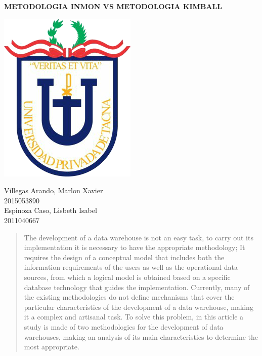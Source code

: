 \documentclass[preprint,12pt]{elsarticle}
\begin{document}
	
	\begin{center}
		\huge \textbf{METODOLOGIA INMON VS METODOLOGIA KIMBALL} 
	\end{center}
	\vspace{\baselineskip}
	\begin{center}
		\includegraphics[scale=0.37]{./IMAGENES/logo}
	\end{center}
	\begin{multicols}

		\begin{center}
		    Villegas Arando, Marlon Xavier\\            2015053890\\
			\columnbreak
			Espinoza Caso, Lisbeth Isabel \\
			2011040667\\               
			
		\end{center}
		\normalsize			
	\end{multicols}
\newpage
	\begin{frontmatter}
		\begin{abstract}
The development of a data warehouse is not an easy task, to carry out its implementation it is necessary to have the appropriate methodology; It requires the design of a conceptual model that includes both the information requirements of the users as well as the operational data sources, from which a logical model is obtained based on a specific database technology that guides the implementation. Currently, many of the existing methodologies do not define mechanisms that cover the particular characteristics of the development of a data warehouse, making it a complex and artisanal task. To solve this problem, in this article a study is made of two methodologies for the development of data warehouses, making an analysis of its main characteristics to determine the most appropriate.

		\end{abstract}
\end{frontmatter}
\end{document}

